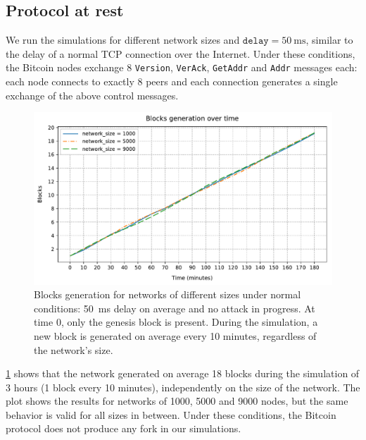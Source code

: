 \subsection{Protocol at rest}
We run the simulations for different network sizes and $\texttt{delay} = \SI{50}{\milli\second}$, similar to the delay of a normal TCP connection over the Internet.
Under these conditions, the Bitcoin nodes exchange $8$ \texttt{Version}, \texttt{VerAck}, \texttt{GetAddr} and \texttt{Addr} messages each:
each node connects to exactly \num{8} peers and each connection generates a single exchange of the above control messages.

\begin{figure}[h!]
	\centering
	\includegraphics[width=\myplotswitdth \columnwidth]{plots/blocks_rest_linechart}
	\caption[Blocks generation for networks of different sizes]{
		Blocks generation for networks of different sizes under normal conditions:
		\SI{50}{\milli\second} delay on average and no attack in progress.
		At time \num{0}, only the genesis block is present.
		During the simulation, a new block is generated on average every \num{10} minutes, regardless of the network's size.
	}
	\label{fig:blocks-rest-linechart}
\end{figure}

\cref{fig:blocks-rest-linechart} shows that the network generated on average \num{18} blocks during the simulation of \num{3} hours (\num{1} block every \num{10} minutes), independently on the size of the network.
The plot shows the results for networks of \num{1000}, \num{5000} and \num{9000} nodes, but the same behavior is valid for all sizes in between.
Under these conditions, the Bitcoin protocol does not produce any fork in our simulations.

